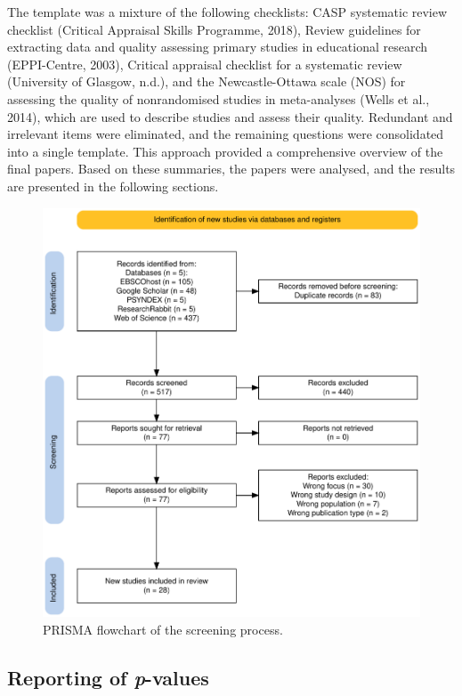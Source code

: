 \documentclass[
  stu,floatsintext]{apa7}
\begin{document}
The template was a mixture of the following checklists: CASP systematic review checklist (Critical Appraisal Skills Programme, 2018), Review guidelines for extracting data and quality assessing primary studies in educational research (EPPI-Centre, 2003), Critical appraisal checklist for a systematic review (University of Glasgow, n.d.), and the Newcastle-Ottawa scale (NOS) for assessing the quality of nonrandomised studies in meta-analyses (Wells et al., 2014), which are used to describe studies and assess their quality.
Redundant and irrelevant items were eliminated, and the remaining questions were consolidated into a single template.
This approach provided a comprehensive overview of the final papers.
Based on these summaries, the papers were analysed, and the results are presented in the following sections.

\begin{figure}
\centering
\includegraphics{files/prisma.pdf}
\caption{\label{fig:prisma}PRISMA flowchart of the screening process.}
\end{figure}

\subsection{\texorpdfstring{Reporting of \emph{p}-values}{Reporting of p-values}}\label{reporting-of-p-values}
\end{document}
